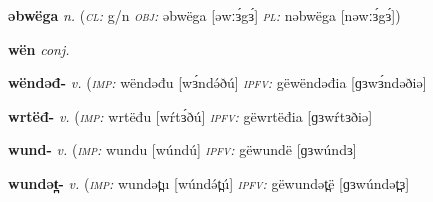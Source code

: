 \newentry
\headword\textbf{əbwëga}  
\ipa{[əwːɜ́gɜ́]}
\synpos\textit{n.} 
\class(\textit{\textsc{cl:}} {g/n}
\object\textit{\textsc{obj:}} əbwëga [əwːɜ́gɜ́]
\plural\textit{\textsc{pl:}} nəbwëga [nəwːɜ́gɜ́])

\newentry
\headword\textbf{wën}  
\ipa{[wɜn]}
\synpos\textit{conj.} 

\newentry
\headword\textbf{wëndəđ-}  
\ipa{[wɜ́ndəð-]}
\synpos\textit{v.} 
\imperative(\textit {\textsc{imp:}} wëndəđu [wɜ́ndə́ðú]
\imperfective\textit{\textsc{ipfv:}} gëwëndəđia [ɡɜwɜ́ndəðiə] 

\newentry
\headword\textbf{wrtëđ-}  
\ipa{[wŕtɜð-]}
\synpos\textit{v.} 
\imperative(\textit {\textsc{imp:}} wrtëđu [wŕtɜ́ðú]
\imperfective\textit{\textsc{ipfv:}} gëwrtëđia [ɡɜwŕtɜðiə]

\newentry
\headword\textbf{wund-}  
\ipa{[wúnd-]}
\synpos\textit{v.} 
\imperative(\textit {\textsc{imp:}} wundu [wúndú]
\imperfective\textit{\textsc{ipfv:}} gëwundë [ɡɜwúndɜ]

\newentry
\headword\textbf{wundət̪-}  
\ipa{[wúndət̪-]}
\synpos\textit{v.} 
\imperative(\textit {\textsc{imp:}} wundət̪u [wúndə́t̪ú]
\imperfective\textit{\textsc{ipfv:}} gëwundət̪ë [ɡɜwúndət̪ɜ]






  